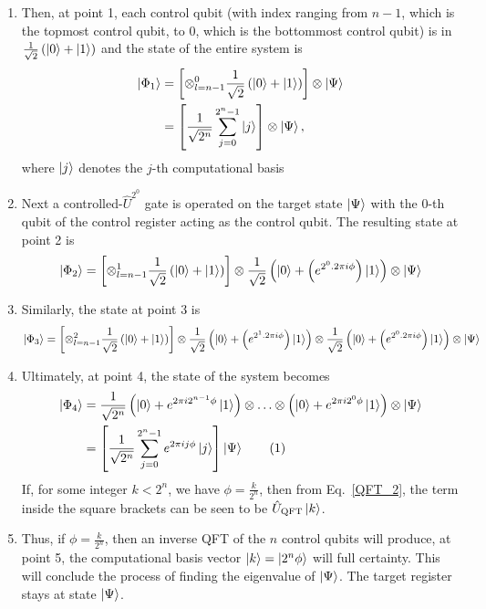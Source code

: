 \documentclass[12pt,oneside]{book}
\newcommand\numberthis{\addtocounter{equation}{1}\tag{\theequation}}
\begin{document}
\begin{enumerate}
    \item Then, at point 1, each control qubit (with index ranging from $n-1$, which is the topmost control qubit, to 0, which is the bottommost control qubit) is in $\frac{1}{\sqrt{2}}\left(\ket{0}+\ket{1}\right)$ and the state of the entire system is
    \begin{align*}
        \ket{\Phi_1}&{}=\left[\otimes_{l=n-1}^{0}\frac{1}{\sqrt{2}}\left(\ket{0}+\ket{1}\right)\right]\otimes\ket{\Psi}\\
        &{}=\left[\frac{1}{\sqrt{2^n}}\sum_{j=0}^{2^n-1}\ket{j}\right]\otimes\ket{\Psi},
    \end{align*}
    where $\ket{j}$ denotes the $j$-th computational basis
    \item Next a controlled-$\hat{U}^{2^0}$ gate is operated on the target state $\ket{\Psi}$ with the $0$-th qubit of the control register acting as the control qubit. The resulting state at point 2 is
    \begin{align*}
        \ket{\Phi_2}=\left[\otimes_{l=n-1}^{1}\frac{1}{\sqrt{2}}\left(\ket{0}+\ket{1}\right)\right] \otimes \frac{1}{\sqrt{2}}\left(\ket{0}+\left(e^{2^0 . 2\pi i \phi}\right)\ket{1}\right) \otimes \ket{\Psi}
    \end{align*}
    \item Similarly, the state at point 3 is
    \begin{align*}
        \ket{\Phi_3}=\left[\otimes_{l=n-1}^{2}\frac{1}{\sqrt{2}}\left(\ket{0}+\ket{1}\right)\right] \otimes \frac{1}{\sqrt{2}}\left(\ket{0}+\left(e^{2^1 . 2\pi i \phi}\right)\ket{1}\right) \otimes \frac{1}{\sqrt{2}}\left(\ket{0}+\left(e^{2^0 . 2\pi i \phi}\right)\ket{1}\right) \otimes \ket{\Psi}
    \end{align*}
    \item Ultimately, at point 4, the state of the system becomes
    \begin{align*}\label{QPE_4}
        \ket{\Phi_4}&{}= \frac{1}{\sqrt{2^n}}\left(\ket{0}+e^{2\pi i 2^{n-1}\phi}\ket{1}\right)\otimes\hdots\otimes \left(\ket{0}+e^{2\pi i 2^0\phi}\ket{1}\right)\otimes \ket{\Psi}\\
        &{}= \left[\frac{1}{\sqrt{2^n}} \sum_{j=0}^{2^n-1}e^{2\pi i j \phi}\ket{j}\right]\ket{\Psi}\numberthis
    \end{align*}
    If, for some integer $k<2^n$, we have $\phi=\frac{k}{2^n}$, then from Eq.~\ref{QFT_2}, the term inside the square brackets can be seen to be $\hat{U}_{\mathrm{QFT}}\ket{k}$.
    \item Thus, if $\phi=\frac{k}{2^n}$, then an inverse QFT of the $n$ control qubits will produce, at point 5, the computational basis vector $\ket{k}=\ket{2^n\phi}$ will full certainty. This will conclude the process of finding the eigenvalue of $\ket{\Psi}$. The target register stays at state $\ket{\Psi}$.
    

\end{enumerate}
\end{document}
